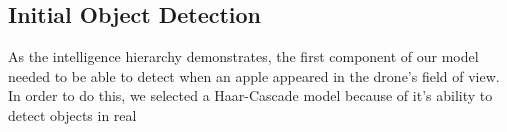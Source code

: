 \subsection{Initial Object Detection}
As the intelligence hierarchy demonstrates, the first component of our model needed to be able to detect when an apple appeared in the drone's field of view. 
In order to do this, we selected a Haar-Cascade model because of it's ability to detect objects in real
